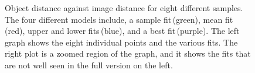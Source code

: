 \documentclass[twocolumn]{aastex6}
\begin{document}
\begin{figure}[ht]
  \centering
  \caption{Object distance against image distance for eight different samples. The four different models include, a sample fit\,(green), mean fit\,(red), upper and lower fits\,(blue), and a best fit\,(purple). The left graph shows the eight individual points and the various fits. The right plot is a zoomed region of the graph, and it shows the fits that are not well seen in the full version on the left.}
  \label{graphs}
\end{figure}
\end{document}
